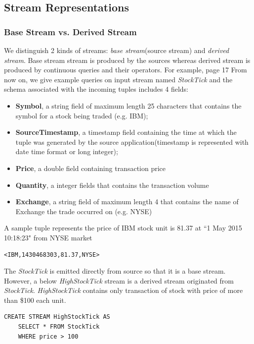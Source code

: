 \subsection*{Stream Representations}
\subsubsection*{Base Stream vs. Derived Stream}
We distinguish 2 kinds of streams: \textit{base stream}(source stream) and \textit{derived stream}. Base stream stream is produced by the sources whereas derived stream is produced by continuous queries and their operators\citep{Arasu:2006:CCQ}. For example, \citep{Golab:2010} page 17
From now on, we give example queries on input stream named \textit{StockTick}\citep{StreamBaseTut} and the schema associated with the incoming tuples includes 4 fields:
\begin{itemize}
\item \textbf{Symbol}, a string field of maximum length 25 characters that contains the symbol for a stock being traded (e.g. IBM);
\item \textbf{SourceTimestamp}, a timestamp field containing the time at which the tuple was generated by the source application(timestamp is represented with date time format or long integer);
\item \textbf{Price}, a double field containing transaction price
\item \textbf{Quantity}, a integer fields that contains the transaction volume
\item \textbf{Exchange}, a string field of maximum length 4 that contains the name of Exchange the trade occurred on (e.g. NYSE)

\end{itemize}
A sample tuple represents the price of IBM stock unit is 81.37 at ``1 May 2015 10:18:23" from NYSE market 
\begin{verbatim}
<IBM,1430468303,81.37,NYSE>
\end{verbatim}

The \textit{StockTick} is emitted directly from source so that it is a base stream. However, a below \textit{HighStockTick} stream is a derived stream originated from \textit{StockTick}. \textit{HighStockTick} contains only transaction of stock with price of more than \$100 each unit.

\begin{verbatim}
CREATE STREAM HighStockTick AS
	SELECT * FROM StockTick 
	WHERE price > 100
\end{verbatim}

